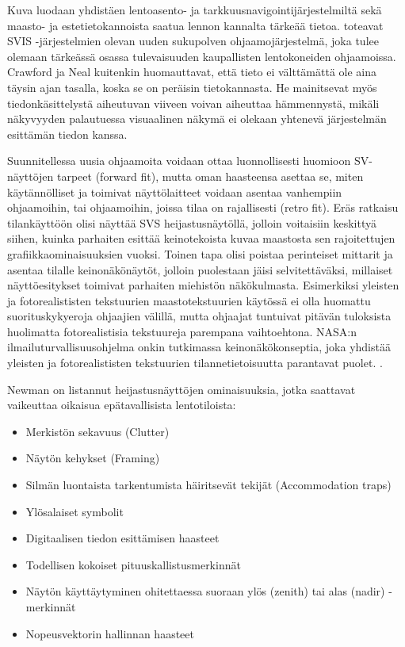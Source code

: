 \documentclass[utf8,bachelor,manualbib]{gradu3}
\begin{document}
Kuva luodaan yhdistäen lentoasento- ja tarkkuusnavigointijärjestelmiltä sekä maasto- ja estetietokannoista saatua lennon kannalta tärkeää tietoa. \cite{schnellym2004} toteavat SVIS -järjestelmien olevan uuden sukupolven ohjaamojärjestelmä, joka tulee olemaan tärkeässä osassa tulevaisuuden kaupallisten lentokoneiden ohjaamoissa. Crawford ja Neal kuitenkin \citeyearpar{crawfordneal2006} huomauttavat, että tieto ei välttämättä ole aina täysin ajan tasalla, koska se on peräisin tietokannasta. He mainitsevat myös tiedonkäsittelystä aiheutuvan viiveen voivan aiheuttaa hämmennystä, mikäli näkyvyyden palautuessa visuaalinen näkymä ei olekaan yhtenevä järjestelmän esittämän tiedon kanssa.

Suunnitellessa uusia ohjaamoita voidaan ottaa luonnollisesti huomioon SV-näyttöjen tarpeet (forward fit), mutta oman haasteensa asettaa se, miten käytännölliset ja toimivat näyttölaitteet voidaan asentaa vanhempiin ohjaamoihin, tai ohjaamoihin, joissa tilaa on rajallisesti (retro fit). Eräs ratkaisu tilankäyttöön olisi näyttää SVS heijastusnäytöllä, jolloin voitaisiin keskittyä siihen, kuinka parhaiten esittää keinotekoista kuvaa maastosta sen rajoitettujen grafiikkaominaisuuksien vuoksi. Toinen tapa olisi poistaa perinteiset mittarit ja asentaa tilalle keinonäkönäytöt, jolloin puolestaan jäisi selvitettäväksi, millaiset näyttöesitykset toimivat parhaiten miehistön näkökulmasta. Esimerkiksi yleisten ja fotorealististen tekstuurien maastotekstuurien käytössä ei olla huomattu suorituskykyeroja ohjaajien välillä, mutta ohjaajat tuntuivat pitävän tuloksista huolimatta fotorealistisia tekstuureja parempana vaihtoehtona. NASA:n ilmailuturvallisuusohjelma onkin tutkimassa keinonäkökonseptia, joka yhdistää yleisten ja fotorealististen tekstuurien tilannetietoisuutta parantavat puolet. \citep{prinzelym2004}.

Newman \citeyearpar{newman2000} on listannut heijastusnäyttöjen ominaisuuksia, jotka saattavat vaikeuttaa oikaisua epätavallisista lentotiloista:

\begin{itemize}
\item Merkistön sekavuus (Clutter)
\item Näytön kehykset (Framing)
\item Silmän luontaista tarkentumista häiritsevät tekijät (Accommodation traps)
\item Ylösalaiset symbolit
\item Digitaalisen tiedon esittämisen haasteet
\item Todellisen kokoiset pituuskallistusmerkinnät
\item Näytön käyttäytyminen ohitettaessa suoraan ylös (zenith) tai alas (nadir) -merkinnät
\item Nopeusvektorin hallinnan haasteet
\end{itemize} 
\end{document}
